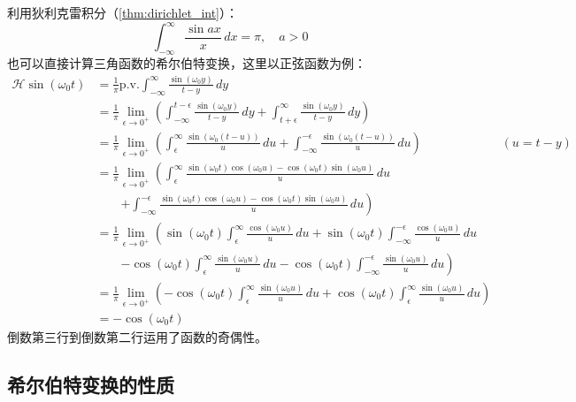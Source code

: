 \begin{example}
    利用狄利克雷积分（\cref{thm:dirichlet_int}）：
    \[\int_{-\infty}^{\infty}\frac{\sin ax}{x}\,dx=\pi,\quad a>0\]
    也可以直接计算三角函数的希尔伯特变换，这里以正弦函数为例：
    \begin{align*}
        \mathcal{H} \sin(\omega_0 t)&=\frac{1}{\pi}\text{p.v.}\int_{-\infty}^{\infty}\frac{\sin(\omega_0 y)}{t-y}\,dy\\
        &=\frac{1}{\pi}\lim_{\epsilon\to 0^+}\left(\int_{-\infty}^{t-\epsilon}\frac{\sin(\omega_0 y)}{t-y}\,dy+\int_{t+\epsilon}^{\infty}\frac{\sin(\omega_0 y)}{t-y}\,dy\right)\\
        &=\frac{1}{\pi}\lim_{\epsilon\to 0^+}\left(\int_{\epsilon}^{\infty}\frac{\sin(\omega_0 (t-u))}{u}\,du+\int_{-\infty}^{-\epsilon}\frac{\sin(\omega_0 (t-u))}{u}\,du\right)& (u=t-y)\\
        &=\frac{1}{\pi}\lim_{\epsilon\to 0^+}\left(\int_{\epsilon}^{\infty}\frac{\sin(\omega_0 t)\cos(\omega_0 u)-\cos(\omega_0 t)\sin(\omega_0 u)}{u}\,du\right.\\
        &\qquad \left.+\int_{-\infty}^{-\epsilon}\frac{\sin(\omega_0 t)\cos(\omega_0 u)-\cos(\omega_0 t)\sin(\omega_0 u)}{u}\,du\right)\\
        &=\frac{1}{\pi}\lim_{\epsilon\to 0^+}\left(\sin(\omega_0 t)\int_{\epsilon}^{\infty}\frac{\cos(\omega_0 u)}{u}\,du+\sin(\omega_0 t)\int_{-\infty}^{-\epsilon}\frac{\cos(\omega_0 u)}{u}\,du\right.\\
        &\qquad \left.-\cos(\omega_0 t)\int_{\epsilon}^{\infty}\frac{\sin(\omega_0 u)}{u}\,du-\cos(\omega_0 t)\int_{-\infty}^{-\epsilon}\frac{\sin(\omega_0 u)}{u}\,du\right)\\
        &=\frac{1}{\pi}\lim_{\epsilon\to 0^+}\left(-\cos(\omega_0 t)\int_{\epsilon}^{\infty}\frac{\sin(\omega_0 u)}{u}\,du+\cos(\omega_0 t)\int_{\epsilon}^{\infty}\frac{\sin(\omega_0 u)}{u}\,du\right)\\
        &=-\cos(\omega_0 t)
    \end{align*}
    倒数第三行到倒数第二行运用了函数的奇偶性。
\end{example}

\subsection{希尔伯特变换的性质}\label{sub:prop_of_hilbert}

